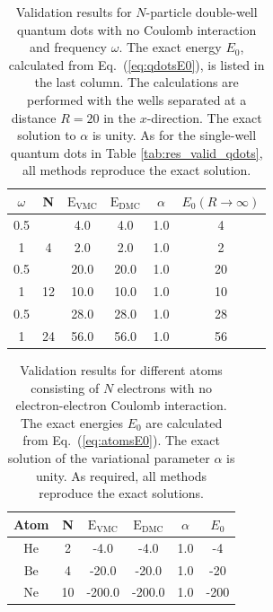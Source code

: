 \setlength{\tabcolsep}{0.8cm}
\begin{table}[h]
\begin{center}
\begin{tabular}{cc|cccc}
  $\omega$   & N & $\mathrm{E_{VMC}}$ & $\mathrm{E_{DMC}}$ & $\alpha$ & $E_0(R\to\infty)$ \\
\hline
  0.5  &       &   4.0   & 4.0   &   1.0    & 4   \\
  1    &   4   &   2.0   & 2.0   &   1.0    & 2   \\
  0.5  &       &   20.0  & 20.0  &   1.0    & 20  \\
  1    &   12  &   10.0  & 10.0  &   1.0    & 10  \\
  0.5  &       &   28.0  & 28.0  &   1.0    & 28   \\
  1    &   24  &   56.0  & 56.0  &   1.0    & 56   \\
\end{tabular}
\caption{Validation results for $N$-particle double-well quantum dots with no Coulomb interaction and frequency $\omega$. The exact energy $E_0$, calculated from  Eq.~(\ref{eq:qdotsE0}), is listed in the last column. The calculations are performed with the wells separated at a distance $R=20$ in the $x$-direction. The exact solution to $\alpha$ is unity. As for the single-well quantum dots in Table \ref{tab:res_valid_qdots}, all methods reproduce the exact solution. }
\label{tab:res_valid_qdots_doublewell}
\end{center}
\end{table}
\setlength{\tabcolsep}{6pt}

\setlength{\tabcolsep}{0.8cm}
\begin{table}
\begin{center}
\begin{tabular}{cc|cccc}
 Atom &   N     & $\mathrm{E_{VMC}}$ & $\mathrm{E_{DMC}}$ & $\alpha$ & $E_0$\\
\hline
 $\mathrm{He}$ &   2     &   -4.0   &   -4.0   &   1.0  & -4  \\
 $\mathrm{Be}$ &   4     &  -20.0   &  -20.0   &   1.0  & -20 \\
 $\mathrm{Ne}$ &   10    &  -200.0  &  -200.0  &   1.0  & -200\\
\end{tabular}
\caption{Validation results for different atoms consisting of $N$ electrons with no electron-electron Coulomb interaction. The exact energies $E_0$ are calculated from Eq.~(\ref{eq:atomsE0}). The exact solution of the variational parameter $\alpha$ is unity. As required, all methods reproduce the exact solutions.}
\label{tab:res_valid_atoms}
\end{center}
\end{table}
\setlength{\tabcolsep}{6pt}

